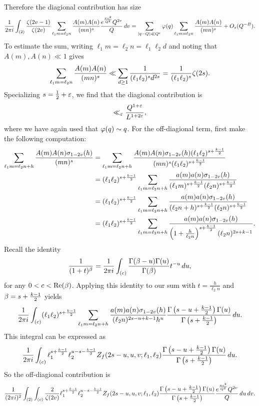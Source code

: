 \documentclass[12pt,reqno,oneside]{amsart}
\begin{document}
  Therefore the diagional contribution has size
  \[
    \frac{1}{2\pi i}\int_{(2)}\frac{\zeta(2v-1)}{\zeta(2v)}\sum_{\ell_{1}m = \ell_{2}n}\frac{A(m)A(n)}{(mn)^{s}}\frac{e^{\frac{\pi v^{2}}{Q^{2}}}Q^{2v}}{Q}\,dv = \sum_{|q-Q| \ll Q^{\varepsilon}}\varphi(q)\sum_{\ell_{1}m = \ell_{2}n}\frac{A(m)A(n)}{(mn)^{s}}+O_{s}(Q^{-B}).
  \]
  To estimate the sum, writing $\ell_{1}m = \ell_{2}n = \ell_{1}\ell_{2}d$ and noting that $A(m),A(n) \ll 1$ gives
  \[
    \sum_{\ell_{1}m = \ell_{2}n}\frac{A(m)A(n)}{(mn)^{s}} \ll \sum_{d \ge 1}\frac{1}{(\ell_{1}\ell_{2})^{s}d^{2s}} = \frac{1}{(\ell_{1}\ell_{2})^{s}}\zeta(2s).
  \]
  Specializing $s = \frac{1}{2}+\varepsilon$, we find that the diagional contribution is
  \[
    \ll_{\varepsilon} \frac{Q^{1+\varepsilon}}{L^{1+2\varepsilon}},
  \]
  where we have again used that $\varphi(q) \sim q$. For the off-diagional term, first make the following computation:
  \begin{align*}
    \sum_{\ell_{1}m = \ell_{2}n+h}\frac{A(m)A(n)\sigma_{1-2v}(h)}{(mn)^{s}} &= \sum_{\ell_{1}m = \ell_{2}n+h}\frac{A(m)A(n)\sigma_{1-2v}(h)(\ell_{1}\ell_{2})^{s+\frac{k-1}{2}}}{(mn)^{s}(\ell_{1}\ell_{2})^{s+\frac{k-1}{2}}} \\
    &= (\ell_{1}\ell_{2})^{s+\frac{k-1}{2}}\sum_{\ell_{1}m = \ell_{2}n+h}\frac{a(m)a(n)\sigma_{1-2v}(h)}{(\ell_{1}m)^{s+\frac{k-1}{2}}(\ell_{2}n)^{s+\frac{k-1}{2}}} \\
    &= (\ell_{1}\ell_{2})^{s+\frac{k-1}{2}}\sum_{\ell_{1}m = \ell_{2}n+h}\frac{a(m)a(n)\sigma_{1-2v}(h)}{(\ell_{2}n+h)^{s+\frac{k-1}{2}}(\ell_{2}n)^{s+\frac{k-1}{2}}} \\
    &= (\ell_{1}\ell_{2})^{s+\frac{k-1}{2}}\sum_{\ell_{1}m = \ell_{2}n+h}\frac{a(m)a(n)\sigma_{1-2v}(h)}{\left(1+\frac{h}{\ell_{2}n}\right)^{s+\frac{k-1}{2}}(\ell_{2}n)^{2s+k-1}}.
  \end{align*}
  Recall the identity
  \[
    \frac{1}{(1+t)^{\beta}} = \frac{1}{2\pi i}\int_{(c)}\frac{\Gamma(\beta-u)\Gamma(u)}{\Gamma(\beta)}t^{-u}\,du,
  \]
  for any $0 < c < \mathrm{Re}(\beta)$. Applying this identity to our sum with $t = \frac{h}{\ell_{2}n}$ and $\beta = s+\frac{k-1}{2}$ yields
  \[
    \frac{1}{2\pi i}\int_{(c)}(\ell_{1}\ell_{2})^{s+\frac{k-1}{2}}\sum_{\ell_{1}m = \ell_{2}n+h}\frac{a(m)a(n)\sigma_{1-2v}(h)}{(\ell_{2}n)^{2s-u+k-1}h^{u}}\frac{\Gamma\left(s-u+\frac{k-1}{2}\right)\Gamma(u)}{\Gamma\left(s+\frac{k-1}{2}\right)}\,du.
  \]
  This integral can be expressed as
  \[
    \frac{1}{2\pi i}\int_{(c)}\ell_{1}^{s+\frac{k-1}{2}}\ell_{2}^{u-s-\frac{k-1}{2}}Z_{f}(2s-u,u,v;\ell_{1},\ell_{2})\frac{\Gamma\left(s-u+\frac{k-1}{2}\right)\Gamma(u)}{\Gamma\left(s+\frac{k-1}{2}\right)}\,du.
  \]
  So the off-diagional contribution is
  \[
    \frac{1}{(2\pi i)^{2}}\int_{(2)}\int_{(c)}\frac{2}{\zeta(2v)}\ell_{1}^{s+\frac{k-1}{2}}\ell_{2}^{u-s-\frac{k-1}{2}}Z_{f}(2s-u,u,v;\ell_{1},\ell_{2})\frac{\Gamma\left(s-u+\frac{k-1}{2}\right)\Gamma(u)}{\Gamma\left(s+\frac{k-1}{2}\right)}\frac{e^{\frac{\pi v^{2}}{Q^{2}}}Q^{2v}}{Q}\,du\,dv.
  \]
\end{document}
